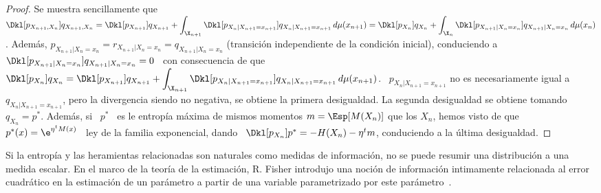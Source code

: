\begin{proof}
  Se        muestra       sencillamente        que        \       $\displaystyle
  \Dkl[p_{X_{n+1},X_n}]{q_{X_{n+1},X_n}}   =   \Dkl[p_{X_{n+1}}]{q_{X_{n+1}}}  +
  \int_{\X_{n+1}}    \Dkl[p_{X_n|X_{n+1}=x_{n+1}}]{q_{X_n|X_{n+1}=x_{n+1}}}   \,
  d\mu(x_{n+1})        =       \Dkl[p_{X_n}]{q_{X_n}}        +       \int_{\X_n}
  \Dkl[p_{X_{n+1}|X_n=x_n}]{q_{X_{n+1}|X_n=x_n}}   \,   d\mu(x_n)$.    Adem\'as,
  $p_{X_{n+1}|X_n=x_n}   =   r_{X_{n+1}|X_n=x_n}   =  q_{X_{n+1}|X_n   =   x_n}$
  (transici\'on  independiente   de  la  condici\'on   inicial),  conduciendo  a
  $\Dkl[p_{X_{n+1}|X_n=x_n}]{q_{X_{n+1}|X_n =  x_n}} = 0$ \  con consecuencia de
  que \ $\displaystyle \Dkl[p_{X_n}]{q_{X_n}} = \Dkl[p_{X_{n+1}}]{q_{X_{n+1}}} +
  \int_{\X_{n+1}} \Dkl[p_{X_n|X_{n+1} =  x_{n+1}}]{q_{X_n|X_{n+1} = x_{n+1}}} \,
  d\mu(x_{n+1})$.  \ $p_{X_n|X_{n+1} = x_{n+1}}$  no es necesariamente igual a \
  $q_{X_n|X_{n+1}  =  x_{n+1}}$, pero  la  divergencia  siendo  no negativa,  se
  obtiene la primera  desigualdad.  La segunda desigualdad se  obtiene tomando \
  $q_{X_n} = p^*$.   Adem\'as, si \ $p^*$ \ es le  entrop\'ia m\'axima de mismos
  momentos $m  = \Esp[M(X_n)]$  que los $X_n$,  hemos visto  de que \  $p^*(x) =
  \e^{\eta^t M(x)}$ \ ley de la familia exponencial, dando \ $\Dkl[p_{X_n}]{p^*}
  = -H(X_n) - \eta^t m$, conduciendo a la \'ultima desigualdad.
\end{proof}



\label{Ssec:SZ:EUR}



\label{Ssec:SZ:Fisher}

Si la  entrop\'ia y las heramientas  relacionadas son naturales  como medidas de
informaci\'on, no se  puede resumir una distribuci\'on a  una medida escalar. En
el marco de la teor\'ia de  la estimaci\'on, R. Fisher introdujo una noci\'on de
informaci\'on intimamente  relacionada al error cuadr\'atico  en la estimaci\'on
de   un  par\'ametro   a  partir   de  una   variable  parametrizado   por  este
par\'ametro~\cite{Fis22, Fis25:07, Kay93, Bos07, CovTho06, Fri04}.

